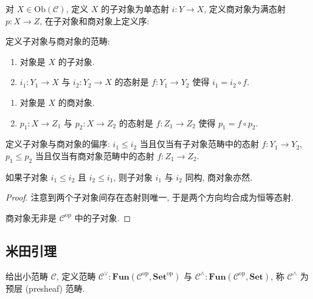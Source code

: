 \begin{definition}
    对 \(X \in \mathrm{Ob} (\mathcal{C})\), 定义 \(X\) 的子对象为单态射 \(i : Y \to X\),
    定义商对象为满态射 \(p : X \to Z\), 在子对象和商对象上定义序:

    定义子对象与商对象的范畴:

    \begin{enumerate}
        \item 对象是 \(X\) 的子对象.
        \item \(i_1 : Y_1 \to X\) 与 \(i_2 : Y_2 \to X\) 的态射是 \(f : Y_1 \to Y_2\) 使得 \(i_1 = i_2 \circ f\).
    \end{enumerate}

    \begin{enumerate}
        \item 对象是 \(X\) 的商对象.
        \item \(p_1 : X \to Z_1\) 与 \(p_2 : X \to Z_2\) 的态射是 \(f : Z_1 \to Z_2\) 使得 \(p_1 = f \circ p_2\).
    \end{enumerate}

    定义子对象与商对象的偏序: \(i_1 \le i_2\) 当且仅当有子对象范畴中的态射 \(f : Y_1 \to Y_2\),
    \(p_1 \le p_2\) 当且仅当有商对象范畴中的态射 \(f : Z_1 \to Z_2\).
\end{definition}

\begin{lemma}
    如果子对象 \(i_1 \le i_2\) 且 \(i_2 \le i_1\), 则子对象 \(i_1\) 与 \(i_2\) 同构, 商对象亦然.

    \begin{proof}
        注意到两个子对象间存在态射则唯一, 于是两个方向均合成为恒等态射.

        商对象无非是 \(\mathcal{C}^{\mathrm{op}}\) 中的子对象.
    \end{proof}
\end{lemma}

\subsection{米田引理}

\begin{definition}[预层]
    给出小范畴 \(\mathcal{C}\), 定义范畴 \(\mathcal{C}^{\vee} : \mathbf{Fun} (\mathcal{C}^{\mathrm{op}}, \mathbf{Set}^{\mathrm{op}})\) 与
    \(\mathcal{C}^{\wedge} : \mathbf{Fun} (\mathcal{C}^{\mathrm{op}}, \mathbf{Set})\), 称 \(\mathcal{C}^{\wedge}\) 为预层 (presheaf) 范畴.
\end{definition}

